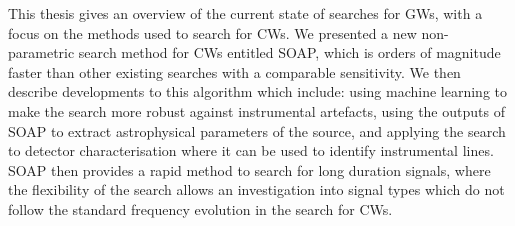 \bigskip

This thesis gives an overview of the current state of
searches for \glspl{GW}, with a focus on the methods used to
search for \glspl{CW}.  We presented a new non-parametric search method for
\glspl{CW} entitled SOAP, which is orders of magnitude faster than other
existing searches with a comparable sensitivity.  We then describe developments
to this algorithm which include: using machine learning to make the search more
robust against instrumental artefacts, using the outputs of SOAP to extract
astrophysical parameters of the source, and applying the search to detector
characterisation where it can be used to identify instrumental lines.  SOAP
then provides a rapid method to search for long duration signals, where the
flexibility of the search allows an investigation into signal types which do
not follow the standard frequency evolution in the search for \glspl{CW}.









